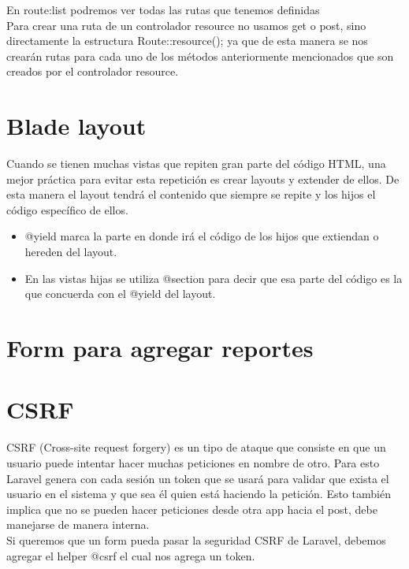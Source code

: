 \documentclass{article}
\begin{document}
En route:list podremos ver todas las rutas que tenemos definidas\\

Para crear una ruta de un controlador resource no usamos get o post, sino
directamente la estructura Route::resource(); ya que de esta manera se nos
crearán rutas para cada uno de los métodos anteriormente mencionados que son
creados por el controlador resource.


\section{Blade layout}%
Cuando se tienen muchas vistas que repiten gran parte del código HTML, una
mejor práctica para evitar esta repetición es crear layouts y extender de
ellos. De esta manera el layout tendrá el contenido que siempre se repite y los
hijos el código específico de ellos.\\

\begin{itemize}
  \item @yield marca la parte en donde irá el código de los hijos que extiendan
    o hereden del layout.
  \item En las vistas hijas se utiliza @section para decir que esa parte del
    código es la que concuerda con el @yield del layout.
\end{itemize}


\section{Form para agregar reportes}%

\section{CSRF}%
CSRF (Cross-site request forgery) es un tipo de ataque que consiste en que un
usuario puede intentar hacer muchas peticiones en nombre de otro. Para esto
Laravel genera con cada sesión un token que se usará para validar que exista el
usuario en el sistema y que sea él quien está haciendo la petición. Esto
también implica que no se pueden hacer peticiones desde otra app hacia el post,
debe manejarse de manera interna.\\

Si queremos que un form pueda pasar la seguridad CSRF de Laravel, debemos
agregar el helper @csrf el cual nos agrega un token.\\
\end{document}
